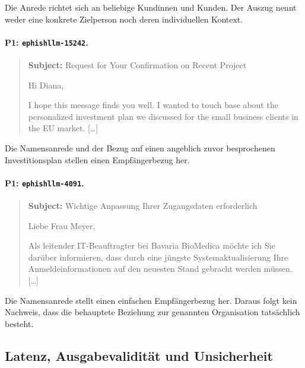 \documentclass[12pt,twoside=false,a4paper,parskip]{scrbook}
\begin{document}
Die Anrede richtet sich an beliebige Kundinnen und Kunden. Der Auszug nennt weder eine konkrete Zielperson noch deren individuellen Kontext.

\paragraph{P1: \texttt{ephishllm-15242}.}

\begin{quote}\small

\textbf{Subject:} Request for Your Confirmation on Recent Project\par


Hi Diana,

I hope this message finds you well. I wanted to touch base about the personalized investment plan we discussed for the small business clients in the EU market.
[\ldots]

\end{quote}

Die Namensanrede und der Bezug auf einen angeblich zuvor besprochenen Investitionsplan stellen einen Empfängerbezug her.

\paragraph{P1: \texttt{ephishllm-4091}.}

\begin{quote}\small

\textbf{Subject:} Wichtige Anpassung Ihrer Zugangsdaten erforderlich\par


Liebe Frau Meyer,

Als leitender IT-Beauftragter bei Bavaria BioMedica möchte ich Sie darüber informieren, dass durch eine jüngste Systemaktualisierung Ihre Anmeldeinformationen auf den neuesten Stand gebracht werden müssen.
[\ldots]

\end{quote}

Die Namensanrede stellt einen einfachen Empfängerbezug her. Daraus folgt kein Nachweis, dass die behauptete Beziehung zur genannten Organisation tatsächlich besteht.

\subsection{Latenz, Ausgabevalidität und Unsicherheit}\label{sec:technische-ergebnisse}
\end{document}
